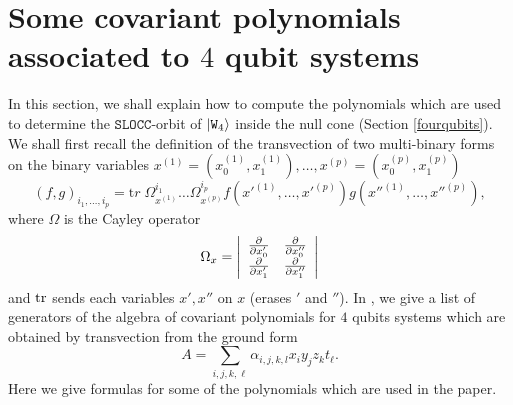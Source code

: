 \documentclass[a4paper,12pt,fleqn]{article}
\newcommand\SLOCC{\mathtt{SLOCC}}
\newcommand\W{\mathtt{W}}
\begin{document}
\section{Some covariant polynomials associated to $4$ qubit systems\label{cov4}}
In this section, we shall explain how to compute the polynomials which are used to determine the $\SLOCC$-orbit of $\ket{\W_4}$ inside the null cone (Section \ref{fourqubits}). We shall first recall the definition of the transvection of two multi-binary forms on the binary variables $x^{(1)}=(x^{(1)}_0,x^{(1)}_1), \dots, x^{(p)}=(x^{(p)}_0,x^{(p)}_1)$
\begin{equation}
(f,g)_{i_1,\dots,i_p}={\mathrm tr}\;\Omega^{i_1}_{x^{(1)}}\dots \Omega_{x^{(p)}}^{i_p}f(x'^{(1)},\dots,x'^{(p)})g(x''^{(1)},\dots,x''^{(p)}),
\end{equation}
where  $\Omega$ is the Cayley operator
\[
\Omega_x=\left|\begin{array}{cc}\partial\over \partial x'_0& \partial\over \partial x''_0
\\ \partial\over \partial x'_1& \partial\over \partial x''_1\end{array}\right|
\]
and $\rm tr$ sends each variables $x', x''$ on $x$ (erases $'$ and $''$). In \cite{2012HLT}, we give a list of generators of the algebra of covariant polynomials for $4$ qubits systems which are obtained by transvection from the ground form
\[{}
A=\sum_{i,j,k,\ell}\alpha_{i,j,k,l}x_{i}y_{j}z_{k}t_{\ell}.
\]
Here we give formulas for some of the polynomials which are used in the paper.
\end{document}
